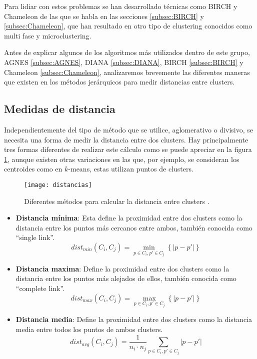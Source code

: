 \documentclass[10pt, a4paper]{article}
\begin{document}
Para lidiar con estos problemas se han desarrollado técnicas como BIRCH y Chameleon de las que se habla en las secciones \ref{subsec:BIRCH} y \ref{subsec:Chameleon}, que han resultado en otro tipo de clustering conocidos como multi fase y microclustering.

Antes de explicar algunos de los algoritmos más utilizados dentro de este grupo, AGNES \ref{subsec:AGNES}, DIANA \ref{subsec:DIANA}, BIRCH \ref{subsec:BIRCH} y Chameleon \ref{subsec:Chameleon}, analizaremos brevemente las diferentes maneras que existen en los métodos jerárquicos para medir distancias entre clusters.




\subsection{\textbf{Medidas de distancia}} \label{subsec:Medidas de distancia}


Independientemente del tipo de método que se utilice, aglomerativo o divisivo, se necesita una forma de medir la distancia entre dos clusters.
Hay principalmente tres formas diferentes de realizar este cálculo como se puede apreciar en la figura \ref{fig:distancias}, aunque existen otras variaciones en las que, por ejemplo, se consideran los centroides como en $k$-means, estas utilizan puntos de clusters.

\begin{figure}[ht]
\centering
\texttt{[image: distancias]}
\caption{Diferentes métodos para calcular la distancia entre clusters \cite{babu}.}
\label{fig:distancias}
\end{figure}


\begin{itemize}
  \item \textbf{Distancia mínima}: Esta define la proximidad entre dos clusters como la distancia entre los puntos más cercanos entre ambos, también conocida como ``single link''.
\begin{equation} dist_{min}(C_i, C_j) =  \min_{p \in C_i, p' \in C_j} \left\{|p - p'|\right\} \end{equation}

  \item \textbf{Distancia maxima}: Define la proximidad entre dos clusters como la distancia entre los puntos más alejados de ellos, también conocida como ``complete link''.
\begin{equation} dist_{max}(C_i, C_j) =  \max_{p \in C_i, p' \in C_j} \left\{|p - p'|\right\} \end{equation}

  \item \textbf{Distancia media}: Define la proximidad entre dos clusters como la distancia media entre todos los puntos de ambos clusters.
\begin{equation} dist_{avg}(C_i, C_j) = \frac{1}{n_i \cdot n_j} \sum_{p \in C_i, p' \in C_j} |p - p'|  \end{equation}
\end{itemize}
\end{document}
